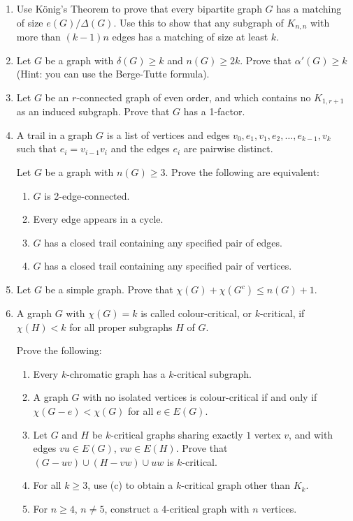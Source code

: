 \begin{enumerate}
    \item Use König's Theorem to prove that every bipartite graph 
    $G$ has a matching of size $e(G)/\Delta(G)$. 
    Use this to show that any subgraph of $K_{n,n}$ with more 
    than $(k - 1)n$ edges has a matching of size at least $k$.

    \item Let $G$ be a graph with $\delta(G) \geq k$ and $n(G) 
    \geq 2k$. Prove that $\alpha'(G) \geq k$ 
    (Hint: you can use the Berge-Tutte formula).

    \item Let $G$ be an $r$-connected graph of even order, 
    and which contains no $K_{1,r+1}$ as an induced subgraph. 
    Prove that $G$ has a 1-factor.

    \item A trail in a graph $G$ is a list of vertices and 
    edges $v_0, e_1, v_1, e_2, \ldots, e_{k-1}, v_k$ such 
    that $e_i = v_{i-1}v_i$ and the edges $e_i$ are pairwise distinct.

    Let $G$ be a graph with $n(G) \geq 3$. Prove the following 
    are equivalent:
    \begin{enumerate}
        \item $G$ is 2-edge-connected.
        \item Every edge appears in a cycle.
        \item $G$ has a closed trail containing any specified 
        pair of edges.
        \item $G$ has a closed trail containing any specified 
        pair of vertices.
    \end{enumerate}

    \item Let $G$ be a simple graph. Prove that 
    $\chi(G) + \chi(G^c) \leq n(G) + 1$.

    \item A graph $G$ with $\chi(G) = k$ is called colour-critical, 
    or $k$-critical, if $\chi(H) < k$ for all proper subgraphs $H$ of $G$.

    Prove the following:
    \begin{enumerate}
        \item Every $k$-chromatic graph has a $k$-critical subgraph.
        \item A graph $G$ with no isolated vertices is colour-critical 
        if and only if $\chi(G - e) < \chi(G)$ for all $e \in E(G)$.
        \item Let $G$ and $H$ be $k$-critical graphs sharing exactly 
        $1$ vertex $v$, and with edges $vu \in E(G)$, $vw \in E(H)$. 
        Prove that $(G - uv) \cup (H - vw) \cup uw$ is $k$-critical.
        \item For all $k \geq 3$, use (c) to obtain a $k$-critical 
        graph other than $K_k$.
        \item For $n \geq 4$, $n \neq 5$, construct a 4-critical 
        graph with $n$ vertices.
    \end{enumerate}
\end{enumerate}